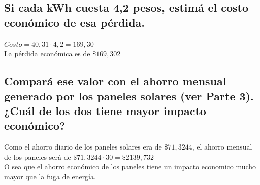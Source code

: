 \documentclass[11pt, a4paper]{article}
\begin{document}
\subsection{Si cada kWh cuesta 4,2 pesos, estimá el costo económico de esa pérdida.}

$Costo = 40,31 \cdot 4,2 = 169,30$ \\

La pérdida económica es de $\$169,302$

\subsection{Compará ese valor con el ahorro mensual generado por los paneles solares (ver Parte 3). ¿Cuál de los dos tiene mayor impacto económico?}

Como el ahorro diario de los paneles solares era de $\$71, 3244$, el ahorro mensual de los paneles será de $\$71,3244 \cdot 30 = \$2139,732$ \\

O sea que el ahorro económico de los paneles tiene un impacto economico mucho mayor que la fuga de energía.
\end{document}
